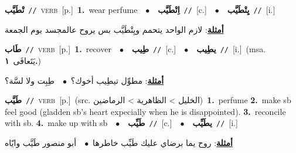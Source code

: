 \documentclass[10pt,a4paper,twoside]{article} %
\begin{document}
\begin{multicols}{2}
{\setlength\topsep{0pt}\textbf{\foreignlanguage{arabic}{تْطَيَّب}}\ {\color{gray}\texttt{//}\color{black}}\ \textsc{verb}\ [p.]\ \textbf{1.}~wear perfume\ \ $\bullet$\ \ \setlength\topsep{0pt}\textbf{\foreignlanguage{arabic}{اِتْطَيَّب}}\ {\color{gray}\texttt{//}\color{black}}\ [c.]\ \ $\bullet$\ \ \setlength\topsep{0pt}\textbf{\foreignlanguage{arabic}{يِتْطَيَّب}}\ {\color{gray}\texttt{//}\color{black}}\ [i.]\  \begin{flushright}\color{gray}\foreignlanguage{arabic}{\textbf{\underline{\foreignlanguage{arabic}{أمثلة}}}: لازم الواحد يتحمم ويِتْطَيَّب بس يروح عالمجسد يوم الجمعة}\end{flushright}\color{black}} \vspace{2mm}

{\setlength\topsep{0pt}\textbf{\foreignlanguage{arabic}{طَاب}}\ {\color{gray}\texttt{//}\color{black}}\ \textsc{verb}\ [p.]\ \textbf{1.}~recover\ \ $\bullet$\ \ \setlength\topsep{0pt}\textbf{\foreignlanguage{arabic}{طِيب}}\ {\color{gray}\texttt{//}\color{black}}\ [c.]\ \ $\bullet$\ \ \setlength\topsep{0pt}\textbf{\foreignlanguage{arabic}{يطِيب}}\ {\color{gray}\texttt{//}\color{black}}\ [i.]\ \color{gray}(msa. \foreignlanguage{arabic}{يَتَعافَى}~\foreignlanguage{arabic}{\textbf{١.}})\color{black}\  \begin{flushright}\color{gray}\foreignlanguage{arabic}{\textbf{\underline{\foreignlanguage{arabic}{أمثلة}}}: مطوِّل تيطِيب أخوك؟\ $\bullet$\ \  طِبِت ولا لسَّة؟}\end{flushright}\color{black}} \vspace{2mm}

{\setlength\topsep{0pt}\textbf{\foreignlanguage{arabic}{طَيَّب}}\ {\color{gray}\texttt{//}\color{black}}\ \textsc{verb}\ [p.]\ (src. \color{gray}\foreignlanguage{arabic}{الخليل > الظاهرية > الرماضين}\color{black})\ \textbf{1.}~perfume  \textbf{2.}~make sb feel good (gladden sb's heart expecially when he is disappointed).  \textbf{3.}~reconcile with sb.  \textbf{4.}~make up with sb\ \ $\bullet$\ \ \setlength\topsep{0pt}\textbf{\foreignlanguage{arabic}{طَيِّب}}\ {\color{gray}\texttt{//}\color{black}}\ [c.]\ \ $\bullet$\ \ \setlength\topsep{0pt}\textbf{\foreignlanguage{arabic}{يطَيِّب}}\ {\color{gray}\texttt{//}\color{black}}\ [i.]\  \begin{flushright}\color{gray}\foreignlanguage{arabic}{\textbf{\underline{\foreignlanguage{arabic}{أمثلة}}}: روح يما برضاي عليك طَيِّب خاطرها\ $\bullet$\ \  أبو منصور طَيَّب وايّاه}\end{flushright}\color{black}} \vspace{2mm}


\end{multicols}
\end{document}

